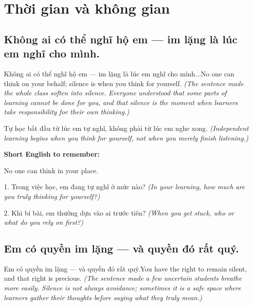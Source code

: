 \chapter{Thời gian và không gian}


\section{Không ai có thể nghĩ hộ em — im lặng là lúc em nghĩ cho mình.}
\begin{truyen}{Không ai có thể nghĩ hộ em — im lặng là lúc em nghĩ cho mình...}{No one can think on your behalf; silence is when you think for yourself.}
\textit{(The sentence made the whole class soften into silence. Everyone understood that some parts of learning cannot be done for you, and that silence is the moment when learners take responsibility for their own thinking.)}
\end{truyen}

\begin{baihoc}
Tự học bắt đầu từ lúc em tự nghĩ, không phải từ lúc em nghe xong.
\textit{(Independent learning begins when you think for yourself, not when you merely finish listening.)}
\end{baihoc}

\begin{ghinhoanh}
\textbf{Short English to remember:}

No one can think in your place.

\end{ghinhoanh}

\begin{tuhocnhanh}
1. Trong việc học, em đang tự nghĩ ở mức nào? \textit{(In your learning, how much are you truly thinking for yourself?)}

2. Khi bí bài, em thường dựa vào ai trước tiên? \textit{(When you get stuck, who or what do you rely on first?)}
\end{tuhocnhanh}
\ngancach


\section{Em có quyền im lặng — và quyền đó rất quý.}
\begin{truyen}{Em có quyền im lặng — và quyền đó rất quý.}{You have the right to remain silent, and that right is precious.}
\textit{(The sentence made a few uncertain students breathe more easily. Silence is not always avoidance; sometimes it is a safe space where learners gather their thoughts before saying what they truly mean.)}
\end{truyen}

